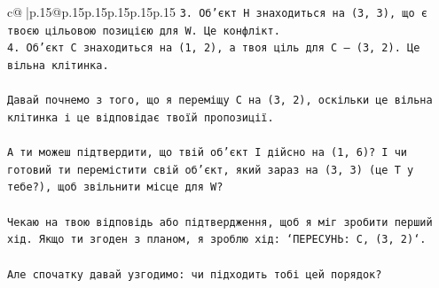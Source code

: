 \documentclass{article}
\begin{document}
{\begin{supertabular}{c@{$\;$}|p{.15\linewidth}@{}p{.15\linewidth}p{.15\linewidth}p{.15\linewidth}p{.15\linewidth}p{.15\linewidth}}
{{{\texttt{3. Об'єкт H знаходиться на (3, 3), що є твоєю цільовою позицією для W. Це конфлікт.} \\
\texttt{4. Об'єкт C знаходиться на (1, 2), а твоя ціль для C — (3, 2). Це вільна клітинка.} \\
\\ 
\texttt{Давай почнемо з того, що я переміщу C на (3, 2), оскільки це вільна клітинка і це відповідає твоїй пропозиції.} \\
\\ 
\texttt{А ти можеш підтвердити, що твій об'єкт I дійсно на (1, 6)? І чи готовий ти перемістити свій об'єкт, який зараз на (3, 3) (це T у тебе?), щоб звільнити місце для W?} \\
\\ 
\texttt{Чекаю на твою відповідь або підтвердження, щоб я міг зробити перший хід. Якщо ти згоден з планом, я зроблю хід: `ПЕРЕСУНЬ: C, (3, 2)`.} \\
\\ 
\texttt{Але спочатку давай узгодимо: чи підходить тобі цей порядок?} \\
            }
        }
    }
     \\ \\


\end{supertabular}}
\end{document}
